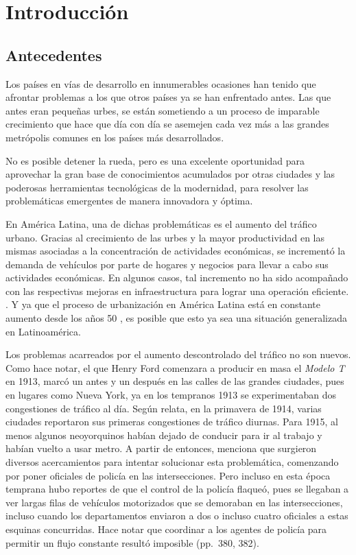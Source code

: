 
\chapter{Introducción} %
\graphicspath{{../imagenes/}}
\linespread{1.3}
\hypertarget{antecedentes}{%
\section{Antecedentes}\label{antecedentes}}

Los países en vías de desarrollo en innumerables ocasiones han tenido
que afrontar problemas a los que otros países ya se han enfrentado
antes. Las que antes eran pequeñas urbes, se están sometiendo a un
proceso de imparable crecimiento que hace que día con día se asemejen
cada vez más a las grandes metrópolis comunes en los países más
desarrollados.

No es posible detener la rueda, pero es una excelente oportunidad para
aprovechar la gran base de conocimientos acumulados por otras ciudades y
las poderosas herramientas tecnológicas de la modernidad, para resolver
las problemáticas emergentes de manera innovadora y óptima.

En América Latina, una de dichas problemáticas es el aumento del tráfico
urbano. Gracias al crecimiento de las urbes y la mayor productividad en
las mismas asociadas a la concentración de actividades económicas, se
incrementó la demanda de vehículos por parte de hogares y negocios para
llevar a cabo sus actividades económicas. En algunos casos, tal
incremento no ha sido acompañado con las respectivas mejoras en
infraestructura para lograr una operación eficiente.
\parencite[1]{Medina-Durango2011}. Y ya que el proceso de urbanización
en América Latina está en constante aumento desde los años 50
\parencite[27]{PdaCunha2009}, es posible que esto ya sea una situación
generalizada en Latinoamérica.

Los problemas acarreados por el aumento descontrolado del tráfico no son
nuevos. Como \textcite{McShane1999} hace notar, el que Henry Ford
comenzara a producir en masa el \emph{Modelo T} en 1913, marcó un antes
y un después en las calles de las grandes ciudades, pues en lugares como
Nueva York, ya en los tempranos 1913 se experimentaban dos congestiones
de tráfico al día. Según relata, en la primavera de 1914, varias
ciudades reportaron sus primeras congestiones de tráfico diurnas. Para
1915, al menos algunos neoyorquinos habían dejado de conducir para ir al
trabajo y habían vuelto a usar metro. A partir de entonces, menciona que
surgieron diversos acercamientos para intentar solucionar esta
problemática, comenzando por poner oficiales de policía en las
intersecciones. Pero incluso en esta época temprana hubo reportes de que
el control de la policía flaqueó, pues se llegaban a ver largas filas de
vehículos motorizados que se demoraban en las intersecciones, incluso
cuando los departamentos enviaron a dos o incluso cuatro oficiales a
estas esquinas concurridas. Hace notar que coordinar a los agentes de
policía para permitir un flujo constante resultó imposible (pp.~380,
382).

